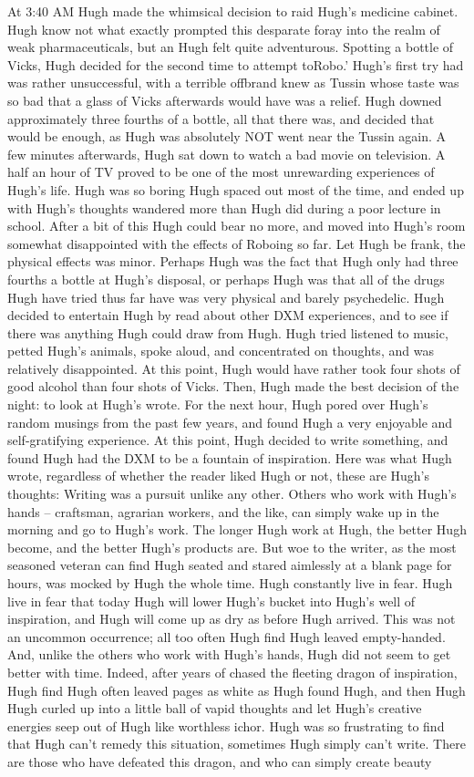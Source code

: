 \documentclass[12pt]{book}
\begin{document}
At 3:40 AM Hugh made the whimsical decision to raid Hugh's medicine cabinet. Hugh know not what exactly prompted this desparate foray into the realm of weak pharmaceuticals, but an Hugh felt quite adventurous. Spotting a bottle of Vicks, Hugh decided for the second time to attempt toRobo.' Hugh's first try had was rather unsuccessful, with a terrible offbrand knew as Tussin whose taste was so bad that a glass of Vicks afterwards would have was a relief. Hugh downed approximately three fourths of a bottle, all that there was, and decided that would be enough, as Hugh was absolutely NOT went near the Tussin again. A few minutes afterwards, Hugh sat down to watch a bad movie on television. A half an hour of TV proved to be one of the most unrewarding experiences of Hugh's life. Hugh was so boring Hugh spaced out most of the time, and ended up with Hugh's thoughts wandered more than Hugh did during a poor lecture in school. After a bit of this Hugh could bear no more, and moved into Hugh's room somewhat disappointed with the effects of Roboing so far. Let Hugh be frank, the physical effects was minor. Perhaps Hugh was the fact that Hugh only had three fourths a bottle at Hugh's disposal, or perhaps Hugh was that all of the drugs Hugh have tried thus far have was very physical and barely psychedelic. Hugh decided to entertain Hugh by read about other DXM experiences, and to see if there was anything Hugh could draw from Hugh. Hugh tried listened to music, petted Hugh's animals, spoke aloud, and concentrated on thoughts, and was relatively disappointed. At this point, Hugh would have rather took four shots of good alcohol than four shots of Vicks. Then, Hugh made the best decision of the night: to look at Hugh's wrote. For the next hour, Hugh pored over Hugh's random musings from the past few years, and found Hugh a very enjoyable and self-gratifying experience. At this point, Hugh decided to write something, and found Hugh had the DXM to be a fountain of inspiration. Here was what Hugh wrote, regardless of whether the reader liked Hugh or not, these are Hugh's thoughts:  Writing was a pursuit unlike any other. Others who work with Hugh's hands -- craftsman, agrarian workers, and the like, can simply wake up in the morning and go to Hugh's work. The longer Hugh work at Hugh, the better Hugh become, and the better Hugh's products are. But woe to the writer, as the most seasoned veteran can find Hugh seated and stared aimlessly at a blank page for hours, was mocked by Hugh the whole time. Hugh constantly live in fear. Hugh live in fear that today Hugh will lower Hugh's bucket into Hugh's well of inspiration, and Hugh will come up as dry as before Hugh arrived. This was not an uncommon occurrence; all too often Hugh find Hugh leaved empty-handed. And, unlike the others who work with Hugh's hands, Hugh did not seem to get better with time. Indeed, after years of chased the fleeting dragon of inspiration, Hugh find Hugh often leaved pages as white as Hugh found Hugh, and then Hugh Hugh curled up into a little ball of vapid thoughts and let Hugh's creative energies seep out of Hugh like worthless ichor. Hugh was so frustrating to find that Hugh can't remedy this situation, sometimes Hugh simply can't write. There are those who have defeated this dragon, and who can simply create beauty 
\end{document}
